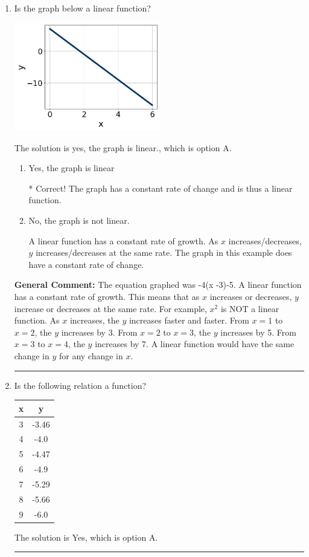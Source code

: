 \documentclass{extbook}[14pt]
\newcommand{\litem}[1]{\item #1

\rule{\textwidth}{0.4pt}}
\begin{document}
\begin{enumerate}\litem{
Is the graph below a linear function?

\begin{center}
    \includegraphics[width=0.5\textwidth]{../Figures/MA_8_F_1_2_graphP.png}
\end{center}


The solution is yes, the graph is linear., which is option A.

\begin{enumerate}[label=\Alph*.]
\item Yes, the graph is linear

* Correct! The graph has a constant rate of change and is thus a linear function.
\item No, the graph is not linear.

A linear function has a constant rate of growth. As $x$ increases/decreases, $y$ increases/decreases at the same rate. The graph in this example does have a constant rate of change.
\end{enumerate}


\textbf{General Comment:} The equation graphed was -4(x -3)-5. A linear function has a constant rate of growth. This means that as $x$ increases or decreases, $y$ increase or decreases at the same rate. For example, $x^2$ is NOT a linear function. As $x$ increases, the $y$ increases faster and faster. From $x=1$ to $x=2$, the $y$ increases by 3. From $x=2$ to $x=3$, the $y$ increases by 5. From $x=3$ to $x=4$, the $y$ increases by 7. A linear function would have the same change in $y$ for any change in $x$.
}
\litem{
Is the following relation a function?


\begin{tabular}{c|c}
x &y\tabularnewline \hline
3 &-3.46\tabularnewline \hline
4 &-4.0\tabularnewline \hline
5 &-4.47\tabularnewline \hline
6 &-4.9\tabularnewline \hline
7 &-5.29\tabularnewline \hline
8 &-5.66\tabularnewline \hline
9 &-6.0\end{tabular}The solution is Yes, which is option A.

}
\end{enumerate}
\end{document}
